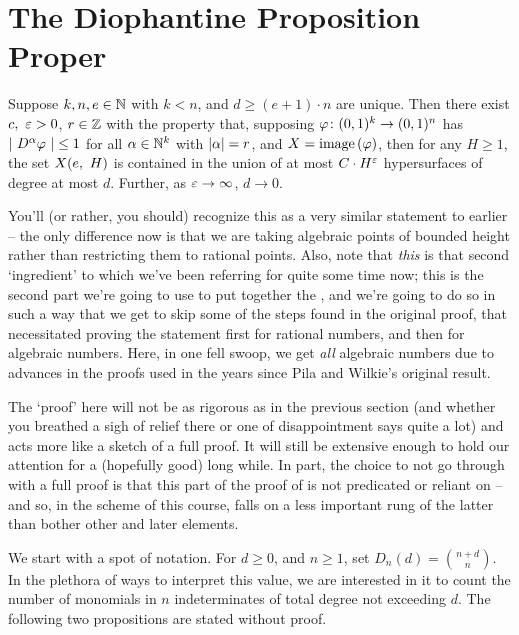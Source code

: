 \section{The Diophantine Proposition Proper}

\begin{proposition}
    Suppose $k, n, e \in \N$ with $k < n$, and $d \geq (e + 1) \cdot n$ are unique. Then there exist $c, \ \eps > 0$, $r \in \Z$ with the property that, supposing $\funcdom{\phi}{(0, 1)^k}{(0, 1)^n}$ has $\lvrv{D^{\alpha} \phi } \leq 1$ for all $\alpha \in \N^k$ with $\norm{\alpha} = r$, and $X = \image{\phi}$, then for any $H \geq 1$, the set $\XeH[H]{e}$ is contained in the union of at most $C \cdot H^{\eps}$ hypersurfaces of degree at most $d$. Further, as $\eps \to \infty$, $d \to 0$.
    \label{prop:dioph}
\end{proposition}

You'll (or rather, you should) recognize this as a very similar statement to earlier -- the only difference now is that we are taking algebraic points of bounded height rather than restricting them to rational points. Also, note that \emph{this} is that second `ingredient' to which we've been referring for quite some time now; this is the second part we're going to use to put together the \pwt, and we're going to do so in such a way that we get to skip some of the steps found in the original proof, that necessitated proving the statement first for rational numbers, and then for algebraic numbers. Here, in one fell swoop, we get \emph{all} algebraic numbers due to advances in the proofs used in the years since Pila and Wilkie's original result.

The `proof' here will not be as rigorous as in the previous section (and whether you breathed a sigh of relief there or one of disappointment says quite a lot) and acts more like a sketch of a full proof. It will still be extensive enough to hold our attention for a (hopefully good) long while. In part, the choice to not go through with a full proof is that this part of the proof of \pw is not predicated or reliant on \om -- and so, in the scheme of this course, falls on a less important rung of the latter than bother other and later elements.

We start with a spot of notation. For $d \geq 0$, and $n \geq 1$, set $D_n(d) = \binom{n+d}{n}$. In the plethora of ways to interpret this value, we are interested in it to count the number of monomials in $n$ indeterminates of total degree not exceeding $d$. The following two propositions are stated without proof.

